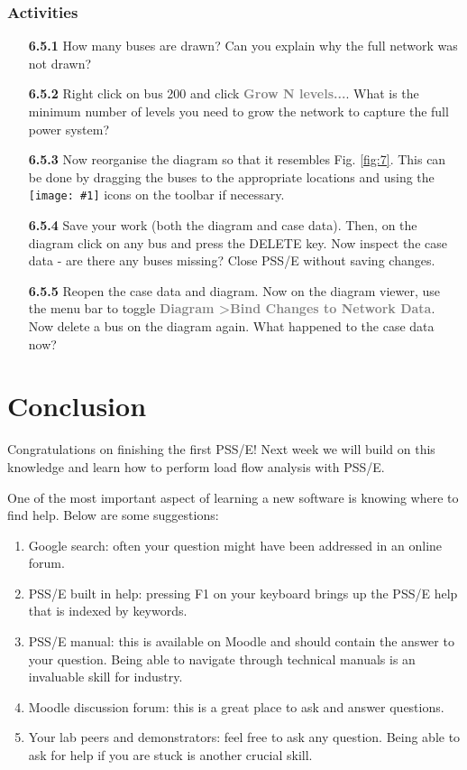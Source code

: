 \documentclass[paper=a4, fontsize=11pt]{article}
\newcommand{\mychar}[1]{%
  \begingroup\normalfont
  \texttt{[image: \#1]}%
  \endgroup
}
\begin{document}
\subsubsection*{Activities}
\begin{enumerate}
\item[\textbf{6.5.1}] How many buses are drawn? Can you explain why the full network was not drawn?
\item[\textbf{6.5.2}] Right click on bus 200 and click \textbf{\textcolor{gray}{Grow N levels...}}. What is the minimum number of levels you need to grow the network to capture the full power system?
\item[\textbf{6.5.3}] Now reorganise the diagram so that it resembles Fig. \ref{fig:7}. This can be done by dragging the buses to the appropriate locations and using the \mychar{rotate.png} icons on the toolbar if necessary.
\item[\textbf{6.5.4}] Save your work (both the diagram and case data). Then, on the diagram click on any bus and press the DELETE key. Now inspect the case data - are there any buses missing? Close PSS/E without saving changes.
\item[\textbf{6.5.5}] Reopen the case data and diagram. Now on the diagram viewer, use the menu bar to toggle  \textbf{\textcolor{gray}{Diagram \textgreater \phantom{ }Bind Changes to Network Data}}. Now delete a bus on the diagram again. What happened to the case data now?



\end{enumerate}


\newpage
\section{Conclusion}
Congratulations on finishing the first PSS/E! Next week we will build on this knowledge and learn how to perform load flow analysis with PSS/E.

One of the most important aspect of learning a new software is knowing where to find help. Below are some suggestions:
\begin{enumerate}
\item Google search: often your question might have been addressed in an online forum.
\item PSS/E built in help: pressing F1 on your keyboard brings up the PSS/E help that is indexed by keywords.
\item PSS/E manual: this is available on Moodle and should contain the answer to your question. Being able to navigate through technical manuals is an invaluable skill for industry.
\item Moodle discussion forum: this is a great place to ask and answer questions.
\item Your lab peers and demonstrators: feel free to ask any question. Being able to ask for help if you are stuck is another crucial skill.
\end{enumerate}
\end{document}
